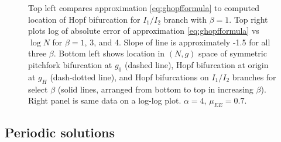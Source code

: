 \documentclass[reqno]{siamonline190516}
\begin{document}
\begin{figure}
\begin{tabular}{cc}
    \end{tabular}
    \caption{Top left compares approximation \cref{eq:ghopfformula} to computed location of Hopf bifurcation for $I_1/I_2$ branch with $\beta = 1$. Top right plots log of absolute error of approximation \cref{eq:ghopfformula} vs $\log N$ for $\beta = 1$, 3, and 4. Slope of line is approximately -1.5 for all three $\beta$. Bottom left shows location in $(N, g)$ space of symmetric pitchfork bifurcation at $g_0$ (dashed line), Hopf bifurcation at origin at $g_H$ (dash-dotted line), and Hopf bifurcations on $I_1/I_2$ branches for select $\beta$ (solid lines, arranged from bottom to top in increasing $\beta$). Right panel is same data on a log-log plot. $\alpha = 4$, $\mu_{EE}= 0.7$. }
    \label{fig:Hopfplots}
\end{figure}


\subsection{Periodic solutions}\label{sec:periodic}
\end{document}
